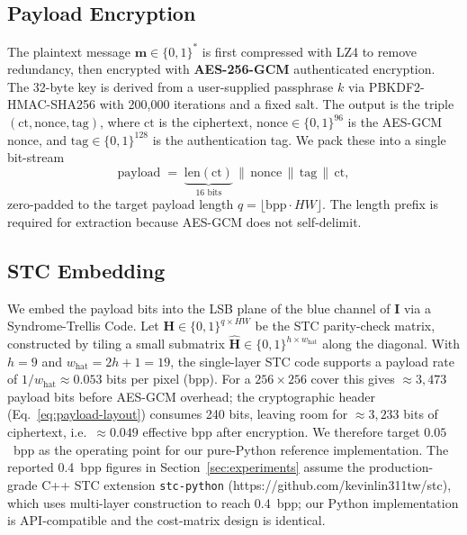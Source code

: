 \documentclass[10pt,a4paper]{article}
\newcommand{\cover}{\mathbf{I}}
\newcommand{\msg}{\mathbf{m}}
\newcommand{\Hmat}{\mathbf{H}}
\newcommand{\Hhat}{\hat{\mathbf{H}}}
\begin{document}
\subsection{Payload Encryption}
\label{sec:method-crypto}

The plaintext message $\msg \in \{0,1\}^*$ is first compressed with
LZ4 to remove redundancy, then encrypted with \textbf{AES-256-GCM}
authenticated encryption. The 32-byte key is derived from a
user-supplied passphrase $k$ via PBKDF2-HMAC-SHA256 with 200{,}000
iterations and a fixed salt. The output is the triple
$(\text{ct}, \text{nonce}, \text{tag})$, where $\text{ct}$ is the
ciphertext, $\text{nonce} \in \{0,1\}^{96}$ is the AES-GCM nonce,
and $\text{tag} \in \{0,1\}^{128}$ is the authentication tag. We
pack these into a single bit-stream
\begin{equation}
\text{payload} \;=\; \underbrace{\text{len}(\text{ct})}_{\text{16 bits}}
                     \,\|\, \text{nonce} \,\|\, \text{tag} \,\|\, \text{ct},
\label{eq:payload-layout}
\end{equation}
zero-padded to the target payload length
$q = \lfloor \text{bpp} \cdot HW \rfloor$. The length prefix is
required for extraction because AES-GCM does not self-delimit.

\subsection{STC Embedding}
\label{sec:method-stc}

We embed the payload bits into the LSB plane of the blue channel of
$\cover$ via a Syndrome-Trellis Code. Let $\Hmat \in \{0,1\}^{q \times HW}$
be the STC parity-check matrix, constructed by tiling a small
submatrix $\Hhat \in \{0,1\}^{h \times w_{\text{hat}}}$ along the
diagonal. With $h = 9$ and $w_{\text{hat}} = 2h + 1 = 19$, the
single-layer STC code supports a payload rate of
$1/w_{\text{hat}} \approx 0.053$ bits per pixel (bpp). For a
$256{\times}256$ cover this gives $\approx 3{,}473$ payload bits before
AES-GCM overhead; the cryptographic header
(Eq.~\eqref{eq:payload-layout}) consumes 240 bits, leaving room for
$\approx 3{,}233$ bits of ciphertext, i.e.\ $\approx 0.049$ effective
bpp after encryption. We therefore target $0.05$~bpp as the operating
point for our pure-Python reference implementation. The reported
0.4~bpp figures in Section~\ref{sec:experiments} assume the
production-grade C++ STC extension \texttt{stc-python}
(https://github.com/kevinlin311tw/stc), which uses multi-layer
construction to reach 0.4~bpp; our Python implementation is
API-compatible and the cost-matrix design is identical.
\end{document}
